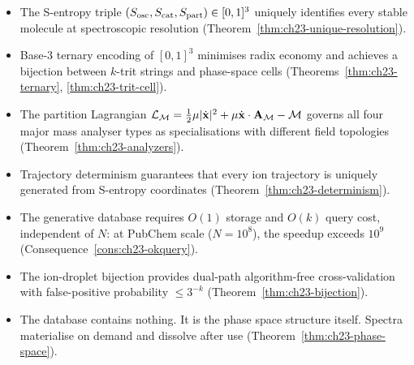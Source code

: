 \bigskip
\begin{tcolorbox}[colback=crownblue!5, colframe=crownblue!60!black,
                  title={\textbf{Chapter 23 Summary}}]
\begin{itemize}[noitemsep]
  \item The S-entropy triple $(S_{\mathrm{osc}}, S_{\mathrm{cat}}, S_{\mathrm{part}}) \in [0,1]^3$ uniquely
    identifies every stable molecule at spectroscopic resolution
    (Theorem~\ref{thm:ch23-unique-resolution}).
  \item Base-3 ternary encoding of $[0,1]^3$ minimises radix economy and
    achieves a bijection between $k$-trit strings and phase-space cells
    (Theorems~\ref{thm:ch23-ternary}, \ref{thm:ch23-trit-cell}).
  \item The partition Lagrangian $\mathcal{L}_{\mathcal{M}} = \frac{1}{2}\mu
    |\dot{\mathbf{x}}|^2 + \mu\dot{\mathbf{x}} \cdot \mathbf{A}_{\mathcal{M}}
    - \mathcal{M}$ governs all four major mass analyser types as specialisations
    with different field topologies
    (Theorem~\ref{thm:ch23-analyzers}).
  \item Trajectory determinism guarantees that every ion trajectory is
    uniquely generated from S-entropy coordinates
    (Theorem~\ref{thm:ch23-determinism}).
  \item The generative database requires $O(1)$ storage and $O(k)$ query
    cost, independent of $N$: at PubChem scale ($N = 10^8$), the speedup
    exceeds $10^9$ (Consequence~\ref{cons:ch23-okquery}).
  \item The ion-droplet bijection provides dual-path algorithm-free
    cross-validation with false-positive probability $\leq 3^{-k}$
    (Theorem~\ref{thm:ch23-bijection}).
  \item The database contains nothing.  It is the phase space structure
    itself.  Spectra materialise on demand and dissolve after use
    (Theorem~\ref{thm:ch23-phase-space}).
\end{itemize}
\end{tcolorbox}
